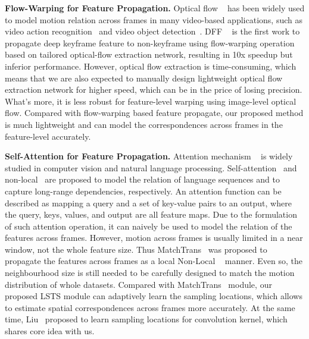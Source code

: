 \documentclass[runningheads]{llncs}
\begin{document}
\noindent \textbf{Flow-Warping for Feature Propagation.}
Optical flow ~\cite{dosovitskiy2015flownet} has been widely used to model motion relation across frames in many video-based applications, such as video action recognition~\cite{simonyan2014two} and video object detection~\cite{russakovsky2015imagenet}. DFF ~\cite{zhu2017deep} is the first work to propagate deep keyframe feature to non-keyframe using flow-warping operation based on tailored optical-flow extraction network, resulting in 10x speedup but inferior performance. However, optical flow extraction is time-consuming, which means that we are also expected to manually design lightweight optical flow extraction network for higher speed, which can be in the price of losing precision. What’s more, it is less robust for feature-level warping using image-level optical flow. Compared with flow-warping based feature propagate, our proposed method is much lightweight and can model the correspondences across frames in the feature-level accurately.

\noindent \textbf{Self-Attention for Feature Propagation.}
Attention mechanism ~\cite{xu2015show,sharma2015action,vaswani2017attention,wang2018non,mnih2014recurrent,gao2019dynamic,gao2018question} is widely studied in computer vision and natural language processing. Self-attention~\cite{vaswani2017attention} and non-local~\cite{wang2018non} are proposed to model the relation of language sequences and to capture long-range dependencies, respectively. An attention function can be described as mapping a query and a set of key-value pairs to an output, where the query, keys, values, and output are all feature maps. Due to the formulation of such attention operation, it can naively be used to model the  relation of the features across frames. 
However, motion across frames is usually limited in a near window, not the whole feature size. Thus MatchTrans~\cite{xiao2018video} was proposed to propagate the features across frames as a local Non-Local ~\cite{wang2018non} manner. Even so, the neighbourhood size is still needed to be carefully designed to match the motion distribution of whole datasets. Compared with MatchTrans~\cite{xiao2018video} module, our proposed LSTS module can adaptively learn the sampling locations, which allows to estimate spatial correspondences across frames more accurately. At the same time, Liu~\cite{liu2019differentiable} proposed to learn sampling locations for convolution kernel, which shares core idea with us.
\end{document}

